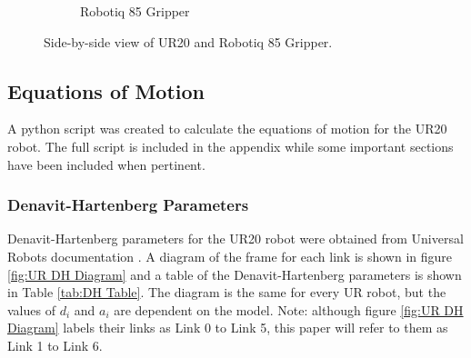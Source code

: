 \documentclass[journal]{new-aiaa}
\begin{document}
\begin{figure}[H]
\begin{subfigure}{0.45\textwidth}
        \caption{Robotiq 85 Gripper \cite{robotiq2020grippers}}
        \label{fig:Robotiq 85 Gripper}
    \end{subfigure}
    \caption{Side-by-side view of UR20 and Robotiq 85 Gripper.}
    \label{fig:side_by_side}
\end{figure}

\subsection{Equations of Motion}\label{sec:Robot Design:Equations of Motion}
A python script was created to calculate the equations of motion for the UR20 robot.
The full script is included in the appendix while some important sections have been included when pertinent.

\subsubsection{Denavit-Hartenberg Parameters}\label{sec:Equations of Motion:DH}

Denavit-Hartenberg parameters for the UR20 robot were obtained from Universal Robots documentation \cite{UR20DH}.
A diagram of the frame for each link is shown in figure \ref{fig:UR DH Diagram} and a table of the Denavit-Hartenberg parameters is shown in Table \ref{tab:DH Table}.
The diagram is the same for every UR robot, but the values of $d_i$ and $a_i$ are dependent on the model.
Note: although figure \ref{fig:UR DH Diagram} labels their links as Link 0 to Link 5, this paper will refer to them as Link 1 to Link 6.
\end{document}
